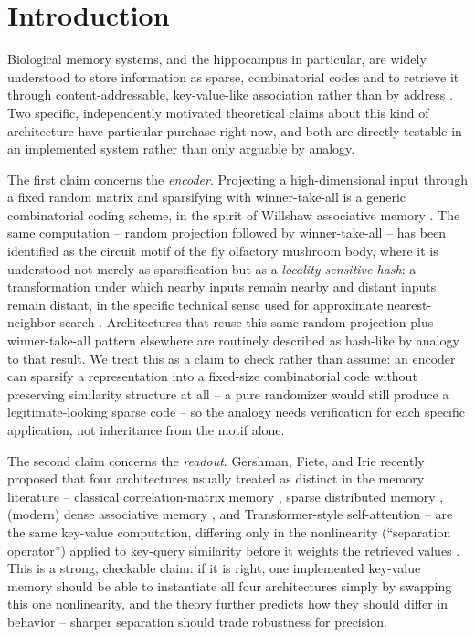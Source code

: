 \documentclass[11pt]{article}
\begin{document}
\section{Introduction}

Biological memory systems, and the hippocampus in particular, are widely understood to store
information as sparse, combinatorial codes and to retrieve it through content-addressable,
key-value-like association rather than by address \cite{marr1971,rolls2013,hopfield1982}. Two
specific, independently motivated theoretical claims about this kind of architecture have
particular purchase right now, and both are directly testable in an implemented system rather
than only arguable by analogy.

The first claim concerns the \emph{encoder}. Projecting a high-dimensional input through a
fixed random matrix and sparsifying with winner-take-all is a generic combinatorial coding
scheme, in the spirit of Willshaw associative memory \cite{willshaw1969}. The same
computation -- random projection followed by winner-take-all -- has been identified as the
circuit motif of the fly olfactory mushroom body, where it is understood not merely as
sparsification but as a \emph{locality-sensitive hash}: a transformation under which nearby
inputs remain nearby and distant inputs remain distant, in the specific technical sense used
for approximate nearest-neighbor search \cite{dasgupta2017}. Architectures that reuse this same
random-projection-plus-winner-take-all pattern elsewhere are routinely described as hash-like
by analogy to that result. We treat this as a claim to check rather than assume: an encoder can
sparsify a representation into a fixed-size combinatorial code without preserving similarity
structure at all -- a pure randomizer would still produce a legitimate-looking sparse code --
so the analogy needs verification for each specific application, not inheritance from the
motif alone.

The second claim concerns the \emph{readout}. Gershman, Fiete, and Irie recently proposed that
four architectures usually treated as distinct in the memory literature -- classical
correlation-matrix memory \cite{kohonen1972}, sparse distributed memory \cite{kanerva1988},
(modern) dense associative memory \cite{krotov2016,ramsauer2020}, and Transformer-style
self-attention \cite{vaswani2017,schlag2021} -- are the same key-value computation, differing
only in the nonlinearity (``separation operator'') applied to key-query similarity before it
weights the retrieved values \cite{gershman2025}. This is a strong, checkable claim: if it is
right, one implemented key-value memory should be able to instantiate all four architectures
simply by swapping this one nonlinearity, and the theory further predicts how they should
differ in behavior -- sharper separation should trade robustness for precision.
\end{document}
